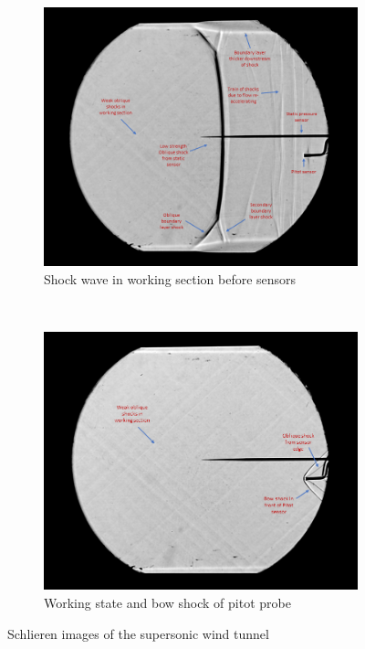 \documentclass{article}
\begin{document}
\begin{figure}[H]
    \centering
    \begin{subfigure}[t]{0.48\textwidth}
        \centering
        \includegraphics[width=1\textwidth]{../Supersonic_Nozzle/shadowgraph_annotations/slide1.PNG}
        \caption{Shock wave in working section before sensors}
        \label{fig:figure6}
    \end{subfigure}
    ~
    \begin{subfigure}[t]{0.48\textwidth}
        \centering
        \includegraphics[width=1\textwidth]{../Supersonic_Nozzle/shadowgraph_annotations/slide2.PNG}
        \caption{Working state and bow shock of pitot probe}
        \label{fig:figure7}
    \end{subfigure}
    \caption{Schlieren images of the supersonic wind tunnel}
\end{figure}
\end{document}
